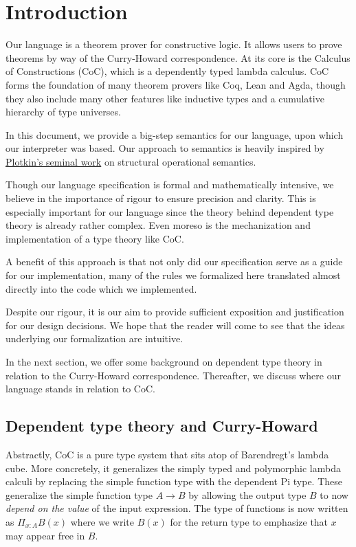 \documentclass{article}
\begin{document}
\section{Introduction}
Our language is a theorem prover for constructive logic. It allows users to prove
theorems by way of the Curry-Howard correspondence. At its core is
the Calculus of Constructions (CoC), which is a dependently typed lambda calculus.
CoC forms the foundation of many theorem provers like Coq, Lean and Agda, 
though they also include many other features like inductive types and a 
cumulative hierarchy of type universes.

In this document, we provide a big-step semantics for our language, upon which
our interpreter was based.
Our approach to semantics is heavily inspired by 
\href{https://homepages.inf.ed.ac.uk/gdp/publications/sos_jlap.pdf}
{Plotkin's seminal work} on structural operational semantics.

Though our language specification is formal and mathematically
intensive, we believe in the importance of rigour to ensure precision and clarity.
This is especially important for our language since the theory behind
dependent type theory is already rather complex.
Even moreso is the mechanization and implementation of a type theory like CoC.

A benefit of this approach is that not only did our specification serve as a
guide for our implementation, many of the rules we formalized here
translated almost directly into the code which we implemented.

Despite our rigour, it is our aim to provide sufficient exposition and
justification for our design decisions.
We hope that the reader will come to see that the ideas underlying our formalization
are intuitive. 

In the next section, we offer some background on dependent type theory in 
relation to the Curry-Howard correspondence. Thereafter, we discuss where our
language stands in relation to CoC.

\subsection{Dependent type theory and Curry-Howard}
Abstractly, CoC is a pure type system that sits atop of Barendregt's
lambda cube.
More concretely, it generalizes the simply typed and polymorphic
lambda calculi by replacing the simple function type with the dependent Pi type.
These generalize the simple function type $A \to B$ by allowing the output type
$B$ to now \textit{depend on the value} of the input expression.
The type of functions is now written as $\Pi_{x : A} B(x)$ where
we write $B(x)$ for the return type to emphasize that $x$ may appear free in
$B$.
\end{document}
